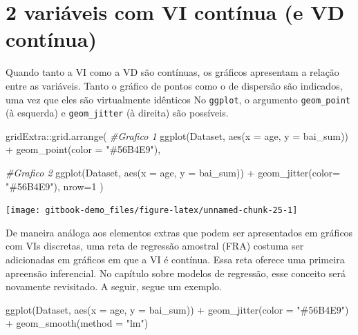 \documentclass[
]{book}
\newenvironment{Shaded}{\begin{snugshade}}{\end{snugshade}}
\newcommand{\AttributeTok}[1]{\textcolor[rgb]{0.77,0.63,0.00}{#1}}
\newcommand{\CommentTok}[1]{\textcolor[rgb]{0.56,0.35,0.01}{\textit{#1}}}
\newcommand{\DecValTok}[1]{\textcolor[rgb]{0.00,0.00,0.81}{#1}}
\newcommand{\FunctionTok}[1]{\textcolor[rgb]{0.00,0.00,0.00}{#1}}
\newcommand{\NormalTok}[1]{#1}
\newcommand{\SpecialCharTok}[1]{\textcolor[rgb]{0.00,0.00,0.00}{#1}}
\newcommand{\StringTok}[1]{\textcolor[rgb]{0.31,0.60,0.02}{#1}}
\begin{document}
\hypertarget{variuxe1veis-com-vi-contuxednua-e-vd-contuxednua}{%
\section{2 variáveis com VI contínua (e VD contínua)}\label{variuxe1veis-com-vi-contuxednua-e-vd-contuxednua}}

Quando tanto a VI como a VD são contínuas, os gráficos apresentam a relação entre as variáveis. Tanto o gráfico de pontos como o de dispersão são indicados, uma vez que eles são virtualmente idênticos No \texttt{ggplot}, o argumento \texttt{geom\_point} (à esquerda) e \texttt{geom\_jitter} (à direita) são possíveis.

\begin{Shaded}
\begin{Highlighting}[]
\NormalTok{gridExtra}\SpecialCharTok{::}\FunctionTok{grid.arrange}\NormalTok{(}
  \CommentTok{\#Grafico 1}
  \FunctionTok{ggplot}\NormalTok{(Dataset, }\FunctionTok{aes}\NormalTok{(}\AttributeTok{x =}\NormalTok{ age, }\AttributeTok{y =}\NormalTok{ bai\_sum)) }\SpecialCharTok{+}
  \FunctionTok{geom\_point}\NormalTok{(}\AttributeTok{color =} \StringTok{"\#56B4E9"}\NormalTok{),}
  
  \CommentTok{\#Grafico 2}
  \FunctionTok{ggplot}\NormalTok{(Dataset, }\FunctionTok{aes}\NormalTok{(}\AttributeTok{x =}\NormalTok{ age, }\AttributeTok{y =}\NormalTok{ bai\_sum)) }\SpecialCharTok{+}
  \FunctionTok{geom\_jitter}\NormalTok{(}\AttributeTok{color=} \StringTok{"\#56B4E9"}\NormalTok{),}
  \AttributeTok{nrow=}\DecValTok{1}
\NormalTok{)}
\end{Highlighting}
\end{Shaded}

\begin{center}\texttt{[image: gitbook-demo\_files/figure-latex/unnamed-chunk-25-1]} \end{center}

De maneira análoga aos elementos extras que podem ser apresentados em gráficos com VIs discretas, uma reta de regressão amostral (FRA) costuma ser adicionadas em gráficos em que a VI é contínua. Essa reta oferece uma primeira apreensão inferencial. No capítulo sobre modelos de regressão, esse conceito será novamente revisitado. A seguir, segue um exemplo.

\begin{Shaded}
\begin{Highlighting}[]
\FunctionTok{ggplot}\NormalTok{(Dataset, }\FunctionTok{aes}\NormalTok{(}\AttributeTok{x =}\NormalTok{ age, }\AttributeTok{y =}\NormalTok{ bai\_sum)) }\SpecialCharTok{+}
  \FunctionTok{geom\_jitter}\NormalTok{(}\AttributeTok{color =} \StringTok{"\#56B4E9"}\NormalTok{) }\SpecialCharTok{+}
  \FunctionTok{geom\_smooth}\NormalTok{(}\AttributeTok{method =} \StringTok{"lm"}\NormalTok{)}
\end{Highlighting}
\end{Shaded}
\end{document}
